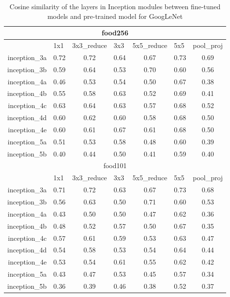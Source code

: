 \begin{table}[htbp]
	\centering
	\caption{Cosine similarity of the layers in Inception modules between fine-tuned models and pre-trained model for GoogLeNet}
	\begin{tabular}{|r|cccccc|}
		\hline
		\multicolumn{7}{|c|}{food256} \\\hline
		
		& \multicolumn{1}{l}{1x1} & \multicolumn{1}{l}{3x3\_reduce} & \multicolumn{1}{l}{3x3} & \multicolumn{1}{l}{5x5\_reduce} & \multicolumn{1}{l}{5x5} & \multicolumn{1}{l|}{pool\_proj } \\\hline
		inception\_3a & 0.72  & 0.72  & 0.64  & 0.67  & 0.73  & 0.69 \\
		inception\_3b & 0.59  & 0.64  & 0.53  & 0.70  & 0.60  & 0.56 \\
		inception\_4a & 0.46  & 0.53  & 0.54  & 0.50  & 0.67  & 0.38 \\
		inception\_4b & 0.55  & 0.58  & 0.63  & 0.52  & 0.69  & 0.41 \\
		inception\_4c & 0.63  & 0.64  & 0.63  & 0.57  & 0.68  & 0.52 \\
		inception\_4d & 0.60  & 0.62  & 0.60  & 0.58  & 0.68  & 0.50 \\
		inception\_4e & 0.60  & 0.61  & 0.67  & 0.61  & 0.68  & 0.50 \\
		inception\_5a & 0.51  & 0.53  & 0.58  & 0.48  & 0.60  & 0.39 \\
		inception\_5b & 0.40  & 0.44  & 0.50  & 0.41  & 0.59  & 0.40 \\  \hline
		\multicolumn{7}{|c|}{food101} \\ \hline
		& \multicolumn{1}{l}{1x1 } & \multicolumn{1}{l}{3x3\_reduce} & \multicolumn{1}{l}{3x3} & \multicolumn{1}{l}{5x5\_reduce} & \multicolumn{1}{l}{5x5} & \multicolumn{1}{l|}{pool\_proj } \\\hline
		inception\_3a & 0.71  & 0.72  & 0.63  & 0.67  & 0.73  & 0.68 \\
		inception\_3b & 0.56  & 0.63  & 0.50  & 0.71  & 0.60  & 0.53 \\
		inception\_4a & 0.43  & 0.50  & 0.50  & 0.47  & 0.62  & 0.36 \\
		inception\_4b & 0.48  & 0.52  & 0.57  & 0.50  & 0.67  & 0.35 \\
		inception\_4c & 0.57  & 0.61  & 0.59  & 0.53  & 0.63  & 0.47 \\
		inception\_4d & 0.54  & 0.58  & 0.53  & 0.54  & 0.64  & 0.44 \\
		inception\_4e & 0.53  & 0.54  & 0.61  & 0.55  & 0.62  & 0.42 \\
		inception\_5a & 0.43  & 0.47  & 0.53  & 0.45  & 0.57  & 0.34 \\
		inception\_5b & 0.36  & 0.39  & 0.46  & 0.38  & 0.52  & 0.37 \\
		\hline
	\end{tabular}%
	\label{tab:cosg}%
\end{table}%


